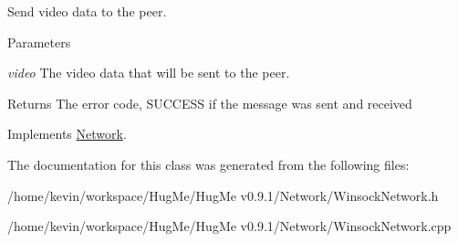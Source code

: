 Send video data to the peer. 


\begin{DoxyParams}{Parameters}
\item[{\em video}]The video data that will be sent to the peer. \end{DoxyParams}
\begin{DoxyReturn}{Returns}
The error code, SUCCESS if the message was sent and received 
\end{DoxyReturn}


Implements \hyperlink{classNetwork_a189df8819d21d4f1a277ca753453045b}{Network}.



The documentation for this class was generated from the following files:\begin{DoxyCompactItemize}
\item 
/home/kevin/workspace/HugMe/HugMe v0.9.1/Network/WinsockNetwork.h\item 
/home/kevin/workspace/HugMe/HugMe v0.9.1/Network/WinsockNetwork.cpp\end{DoxyCompactItemize}
